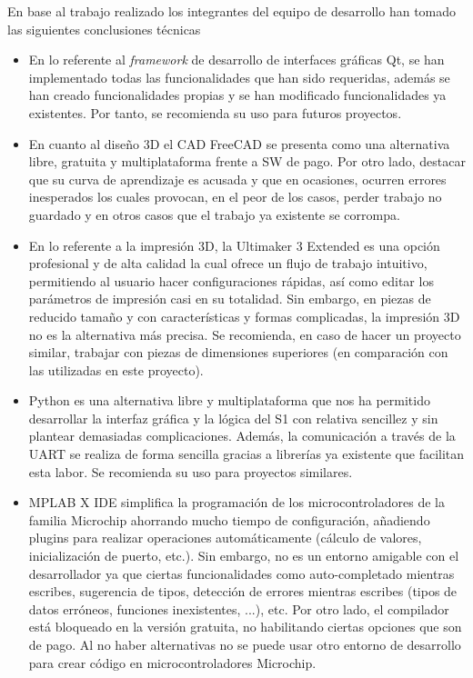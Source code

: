En base al trabajo realizado los integrantes del equipo de desarrollo han tomado las siguientes conclusiones técnicas 

\begin{itemize}

    \item En lo referente al \textit{framework} de desarrollo de interfaces gráficas Qt, se han implementado todas las funcionalidades que han sido  requeridas, además se han creado funcionalidades propias y se han modificado funcionalidades ya existentes. Por tanto, se recomienda su uso para futuros proyectos.
    \item En cuanto al diseño 3D el CAD FreeCAD se presenta como una alternativa libre, gratuita y multiplataforma frente a \ac{SW} de pago. Por otro lado, destacar que su curva de aprendizaje es acusada y que en ocasiones, ocurren errores inesperados los cuales provocan, en el peor de los casos, perder trabajo no guardado y en otros casos que el trabajo ya existente se corrompa.
    \item En lo referente a la impresión 3D, la Ultimaker 3 Extended es una opción profesional y de alta calidad la cual ofrece un flujo de trabajo intuitivo, permitiendo al usuario hacer configuraciones rápidas, así como editar los parámetros de impresión casi en su totalidad. Sin embargo, en piezas de reducido tamaño y con características y formas complicadas, la impresión 3D no es la alternativa más precisa. Se recomienda, en caso de hacer un proyecto similar, trabajar con piezas de dimensiones superiores (en comparación con las utilizadas en este proyecto).
    \item Python es una alternativa libre y multiplataforma que nos ha permitido desarrollar la interfaz gráfica y la lógica del \ac{S1} con relativa sencillez y sin plantear demasiadas complicaciones. Además, la comunicación a través de la UART se realiza de forma sencilla gracias a librerías ya existente que facilitan esta labor. Se recomienda su uso para proyectos similares.
    \item MPLAB X IDE simplifica la programación de los microcontroladores de la familia Microchip ahorrando mucho tiempo de configuración, añadiendo plugins para realizar operaciones automáticamente (cálculo de valores, inicialización de puerto, etc.). Sin embargo, no es un entorno amigable con el desarrollador ya que ciertas funcionalidades como auto-completado mientras escribes, sugerencia de tipos, detección de errores mientras escribes (tipos de datos erróneos, funciones inexistentes, ...), etc. Por  otro lado, el compilador está bloqueado en la versión gratuita, no habilitando ciertas opciones que son de pago. Al no haber alternativas no se puede usar otro entorno de desarrollo para crear código en microcontroladores Microchip.

\end{itemize}
